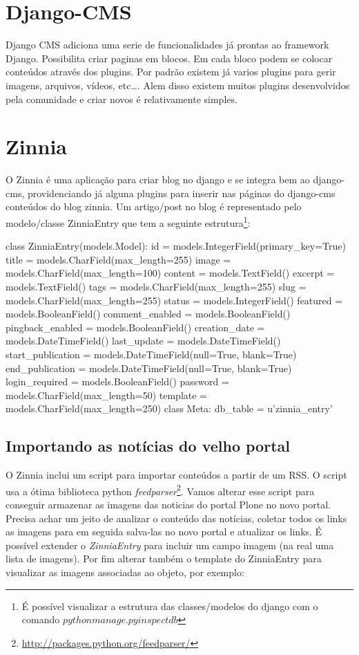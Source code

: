 \section{Django-CMS}\label{django-cms}
Django CMS adiciona uma serie de funcionalidades já prontas ao
framework Django. Possibilita criar paginas em blocos. Em cada bloco
podem se colocar conteúdos através dos plugins. Por padrão existem já
varios plugins para gerir imagens, arquivos, vídeos, etc\ldots. Alem
disso existem muitos plugins desenvolvidos pela comunidade e criar
novos é relativamente simples.

\section{Zinnia}\label{zinnia}
O Zinnia é uma aplicação para criar blog no django e se integra bem ao
django-cms, providenciando já alguna plugins para inserir nas páginas
do django-cms conteúdos do blog zinnia.  Um artigo/post no blog é
representado pelo modelo/classe ZinniaEntry que tem a seguinte
estrutura\footnote{É possível visualizar a estrutura das
  classes/modelos do django com o comando $python manage.py
  inspectdb$}:

\begin{code}
class ZinniaEntry(models.Model):
    id = models.IntegerField(primary_key=True)
    title = models.CharField(max_length=255)
    image = models.CharField(max_length=100)
    content = models.TextField()
    excerpt = models.TextField()
    tags = models.CharField(max_length=255)
    slug = models.CharField(max_length=255)
    status = models.IntegerField()
    featured = models.BooleanField()
    comment_enabled = models.BooleanField()
    pingback_enabled = models.BooleanField()
    creation_date = models.DateTimeField()
    last_update = models.DateTimeField()
    start_publication = models.DateTimeField(null=True, blank=True)
    end_publication = models.DateTimeField(null=True, blank=True)
    login_required = models.BooleanField()
    password = models.CharField(max_length=50)
    template = models.CharField(max_length=250)
    class Meta:
        db_table = u'zinnia_entry'
\end{code}


\subsection{Importando as notícias do velho portal}
O Zinnia inclui um script para importar conteúdos a partir de um
RSS. O script usa a ótima biblioteca python
\emph{feedparser}\footnote{\url{http://packages.python.org/feedparser/}}.
Vamos alterar esse script para conseguir armazenar as imagens das
noticias do portal Plone no novo portal. Precisa achar um jeito de
analizar o conteúdo das notícias, coletar todos os links as imagens
para em seguida salva-las no novo portal e atualizar os links. É
possível extender o \emph{ZinniaEntry} para incluir um campo imagem
(na real uma lista de imagens). Por fim alterar também o template do
ZinniaEntry para visualizar as imagens associadas ao objeto, por
exemplo:

